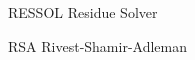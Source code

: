 \listoffigures*
\cleardoublepage



\begin{siglas}
  \item[RESSOL] Residue Solver
  \item[RSA] Rivest-Shamir-Adleman
\end{siglas}


\listofalgorithms
\cleardoublepage

\tableofcontents*
\cleardoublepage
